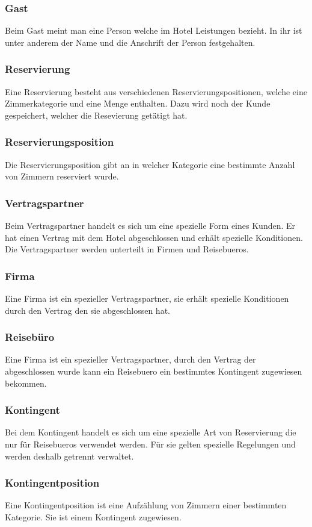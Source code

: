 \documentclass[10pt,a4paper,titlepage]{article}
\begin{document}
\subsubsection{Gast}
Beim Gast meint man eine Person welche im Hotel Leistungen bezieht. In ihr ist unter anderem der Name und die Anschrift der Person festgehalten.
\subsubsection{Reservierung}
Eine Reservierung besteht aus verschiedenen Reservierungspositionen, welche eine Zimmerkategorie und eine Menge enthalten. Dazu wird noch der Kunde gespeichert, welcher die Resevierung getätigt hat.
\subsubsection{Reservierungsposition}
Die Reservierungsposition gibt an in welcher Kategorie eine bestimmte Anzahl von
Zimmern reserviert wurde.
\subsubsection{Vertragspartner}
Beim Vertragspartner handelt es sich um eine spezielle Form eines \Gls{Kunde}n.
Er hat einen Vertrag mit dem Hotel abgeschlossen und erhält spezielle Konditionen. Die Vertragspartner werden unterteilt in Firmen und \Glspl{Reisebuero}.
\subsubsection{Firma}
Eine Firma ist ein spezieller Vertragspartner, sie erhält spezielle Konditionen
durch den Vertrag den sie abgeschlossen hat.
\subsubsection{Reisebüro}
Eine Firma ist ein spezieller Vertragspartner, durch den Vertrag der
abgeschlossen wurde kann ein \Gls{Reisebuero} ein bestimmtes Kontingent
zugewiesen bekommen.
\subsubsection{Kontingent}
Bei dem Kontingent handelt es sich um eine spezielle Art von Reservierung die nur für \Glspl{Reisebuero} verwendet werden. Für sie gelten spezielle Regelungen und werden deshalb getrennt verwaltet.
\subsubsection{Kontingentposition}
Eine Kontingentposition ist eine Aufzählung von Zimmern einer bestimmten
Kategorie. Sie ist einem Kontingent zugewiesen.
\end{document}
